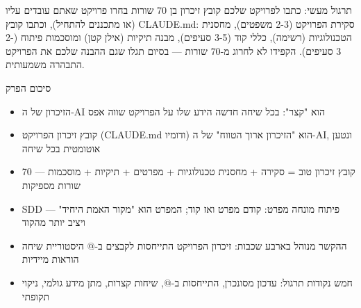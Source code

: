 \begin{tcbpractice}{תרגול מעשי: כתבו לפרויקט שלכם קובץ זיכרון בן 70 שורות}
בחרו פרויקט שאתם עובדים עליו (או מתכננים להתחיל), וכתבו קובץ CLAUDE.md: סקירת הפרויקט (2-3 משפטים), מחסנית הטכנולוגיות (רשימה), כללי קוד (3-5 סעיפים), מבנה תיקיות (אילן קטן) ומוסכמות פיתוח (2-3 סעיפים). הקפידו לא לחרוג מ-70 שורות — בסיום תגלו שגם ההבנה שלכם את הפרויקט התבהרה משמעותית.

\end{tcbpractice}

\begin{tcbsummary}{סיכום הפרק}
\begin{itemize}
  \item הזיכרון של ה-AI הוא "קצר": בכל שיחה חדשה הידע שלו על הפרויקט שווה אפס
  \item קובץ זיכרון הפרויקט (CLAUDE.md ודומיו) הוא "הזיכרון ארוך הטווח" של ה-AI, ונטען אוטומטית בכל שיחה
  \item קובץ זיכרון טוב = סקירה + מחסנית טכנולוגיות + מפרטים + תיקיות + מוסכמות — 70 שורות מספיקות
  \item SDD — פיתוח מונחה מפרט: קודם מפרט ואז קוד; המפרט הוא "מקור האמת היחיד" ויציב יותר מהקוד
  \item ההקשר מנוהל בארבע שכבות: זיכרון הפרויקט התייחסות לקבצים ב-@ היסטוריית שיחה הוראות מיידיות
  \item חמש נקודות תרגול: עדכון מסונכרן, התייחסות ב-@, שיחות קצרות, מתן מידע גולמי, ניקוי תקופתי
\end{itemize}

\end{tcbsummary}
